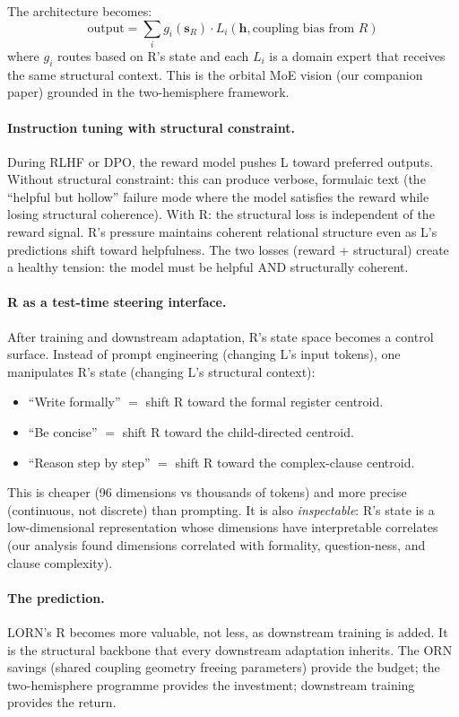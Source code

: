 \documentclass[11pt, a4paper]{article}
\newcommand{\h}{\mathbf{h}}
\theoremstyle{plain}
\theoremstyle{definition}
\theoremstyle{remark}
\begin{document}
The architecture becomes:
\begin{equation}
\text{output} = \sum_i g_i(\mathbf{s}_R) \cdot L_i(\h, \text{coupling bias from } R)
\end{equation}
where $g_i$ routes based on R's state and each $L_i$ is a domain expert that receives the same structural context.
This is the orbital MoE vision (our companion paper) grounded in the two-hemisphere framework.

\paragraph{Instruction tuning with structural constraint.}
During RLHF or DPO, the reward model pushes L toward preferred outputs.
Without structural constraint: this can produce verbose, formulaic text (the ``helpful but hollow'' failure mode where the model satisfies the reward while losing structural coherence).
With R: the structural loss is independent of the reward signal.
R's pressure maintains coherent relational structure even as L's predictions shift toward helpfulness.
The two losses (reward + structural) create a healthy tension: the model must be helpful AND structurally coherent.

\paragraph{R as a test-time steering interface.}
After training and downstream adaptation, R's state space becomes a control surface.
Instead of prompt engineering (changing L's input tokens), one manipulates R's state (changing L's structural context):
\begin{itemize}[nosep]
\item ``Write formally'' $=$ shift R toward the formal register centroid.
\item ``Be concise'' $=$ shift R toward the child-directed centroid.
\item ``Reason step by step'' $=$ shift R toward the complex-clause centroid.
\end{itemize}
This is cheaper (96 dimensions vs thousands of tokens) and more precise (continuous, not discrete) than prompting.
It is also \emph{inspectable}: R's state is a low-dimensional representation whose dimensions have interpretable correlates (our analysis found dimensions correlated with formality, question-ness, and clause complexity).

\paragraph{The prediction.}
LORN's R becomes more valuable, not less, as downstream training is added.
It is the structural backbone that every downstream adaptation inherits.
The ORN savings (shared coupling geometry freeing parameters) provide the budget; the two-hemisphere programme provides the investment; downstream training provides the return.
\end{document}
